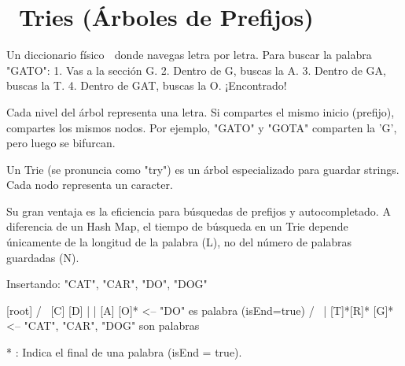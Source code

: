 ﻿\chapter[\emj{🔤}~Tries (Árboles de Prefijos)]{~Tries (Árboles de Prefijos)}

\begin{dsaquees}

Un diccionario físico 📖 donde navegas letra por letra. Para buscar
la palabra "GATO":
1. Vas a la sección G.
2. Dentro de G, buscas la A.
3. Dentro de GA, buscas la T.
4. Dentro de GAT, buscas la O.
¡Encontrado!

Cada nivel del árbol representa una letra. Si compartes el mismo
inicio (prefijo), compartes los mismos nodos. Por ejemplo, "GATO" y 
"GOTA" comparten la 'G', pero luego se bifurcan.

\end{dsaquees}

\begin{dsaotraforma}

Un Trie (se pronuncia como "try") es un árbol especializado para
guardar strings. Cada nodo representa un caracter. 

Su gran ventaja es la eficiencia para búsquedas de prefijos y 
autocompletado. A diferencia de un Hash Map, el tiempo de búsqueda
en un Trie depende únicamente de la longitud de la palabra (L), no
del número de palabras guardadas (N).

\end{dsaotraforma}

\begin{dsadiagrama}
Insertando: "CAT", "CAR", "DO", "DOG"

      [root]
      /    \
    [C]    [D]
     |      |
    [A]    [O]*  <-- "DO" es palabra (isEnd=true)
    / \     |
  [T]*[R]* [G]*  <-- "CAT", "CAR", "DOG" son palabras

* : Indica el final de una palabra (isEnd = true).
\end{dsadiagrama}

